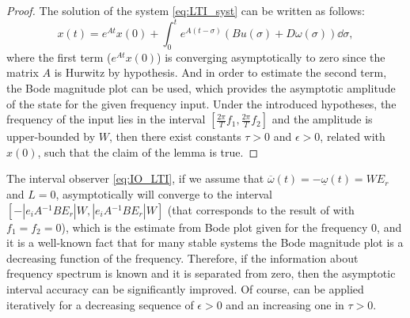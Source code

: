 \begin{proof}
	The solution of the system \eqref{eq:LTI_syst} can be written as follows:
	\[
	x(t)=e^{At}x(0)+\int_{0}^{t}e^{A(t-\sigma)}(Bu(\sigma)+D\omega(\sigma))\dd\sigma,
	\]
	where the first term ($e^{At}x(0)$) is converging asymptotically to zero since the matrix $A$ is Hurwitz by hypothesis. And in order to estimate the second term, the Bode magnitude plot can be used, which provides the asymptotic amplitude of the state for the given frequency input. Under the introduced hypotheses, the frequency of the input lies in the interval $[\frac{2\pi}{T}f_{1},\frac{2\pi}{T}f_{2}]$ and the amplitude is upper-bounded by $W$, then there exist constants $\tau>0$ and $\epsilon>0$, related with $x(0)$, such that the claim of the lemma is true.
\end{proof}
The interval observer \eqref{eq:IO_LTI}, if we assume that $\overline{\omega}(t)=-\underline{\omega}(t)=WE_{r}$ and $L=0$, asymptotically will converge to the interval $[-|e_{i}A{}^{-1}BE_{r}|W,|e_{i}A{}^{-1}BE_{r}|W]$ (that corresponds to the result of  with $f_{1}=f_{2}=0$), which is the estimate from Bode plot given for the frequency $0$, and it is a well-known fact that for many stable systems the Bode magnitude plot is a decreasing function of the frequency. Therefore, if the information about frequency spectrum is known and it is separated from zero, then the asymptotic interval accuracy can be significantly improved. Of course,  can be applied iteratively for a decreasing sequence of $\epsilon>0$ and an increasing one in $\tau>0$.
